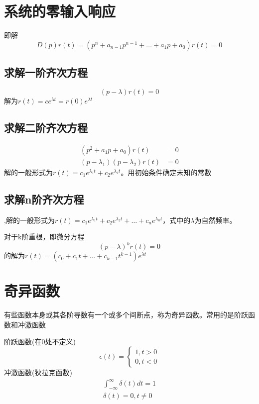 \section{系统的零输入响应}
即解
\begin{equation}
    D(p)r(t)=(p^n+a_{n-1}p^{n-1}+\dots+a_1 p+a_0)r(t)=0
\end{equation}
\subsection{求解一阶齐次方程}
\begin{equation}
    (p-\lambda)r(t)=0
\end{equation}
解为$r(t)=ce^{\lambda t}=r(0)e^{\lambda t}$
\subsection{求解二阶齐次方程}
\begin{align}
    (p^2+a_1 p+a_0)r(t)&=0 \\
    (p-\lambda_1)(p-\lambda_2)r(t)&=0
\end{align}
解的一般形式为$r(t)=c_1 e^{\lambda_1 t}+c_2 e^{\lambda_2 t}$。用初始条件确定未知的常数
\subsection{求解n阶齐次方程}
{\color{red}{当根全为单根时}},解的一般形式为$r(t)=c_1 e^{\lambda_1 t}+c_2 e^{\lambda_2 t}+\dots+c_n e^{\lambda_n t}$，式中的$\lambda$为自然频率。

对于k阶重根，即微分方程
\begin{equation}
    (p-\lambda)^k r(t)=0
\end{equation}
的解为$r(t)=(c_0+c_1 t+\dots+c_{k-1}t^{k-1})e^{\lambda t}$
\section{奇异函数}
有些函数本身或其各阶导数有一个或多个间断点，称为奇异函数。常用的是阶跃函数和冲激函数

阶跃函数(在0处不定义)
\begin{equation}
    \epsilon(t)=\begin{cases}
        1,t>0\\
        0,t<0
    \end{cases}
\end{equation}
冲激函数(狄拉克函数)
\begin{align}
    \int_{-\infty}^{\infty} \delta(t)dt=1\\
    \delta(t)=0,t\neq 0
\end{align}

